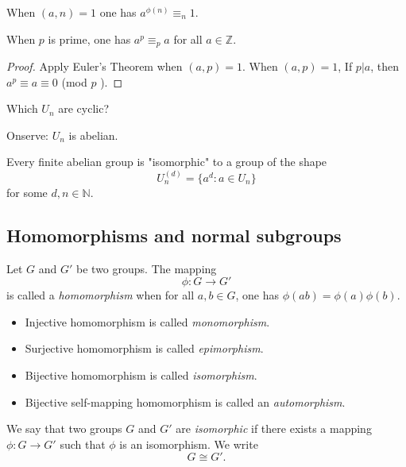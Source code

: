 \begin{corollary}
	When $(a,n) = 1$ one has $a^{\phi(n)} \equiv_n 1$.
\end{corollary}

\begin{corollary}
	When $p$ is prime, one has $a^p \equiv_p a$ for all  $a \in \mathbb{Z}$.
\end{corollary}
\begin{proof}
	Apply Euler's Theorem when $(a,p) = 1$.
	When $(a,p) = 1$, If $p|a$, then $a^p \equiv a \equiv 0$ (mod $p$ ).
\end{proof}

Which $U_n$ are cyclic?

Onserve: $U_n$ is abelian. 

\begin{fact}
	Every finite abelian group is "isomorphic" to a group of the shape \[
		U_n^{(d)} = \{a^d: a \in U_n\} 
	\] 
	for some $d, n \in \mathbb{N}$.
\end{fact}

\subsection{Homomorphisms and normal subgroups}

\begin{definition}[Homomorphism]
	Let $G$ and $G'$ be two groups. The mapping \[
		\phi: G \to  G'
	\] 
	is called a \textit{homomorphism} when for all $a,b \in G$, one has $\phi(ab) = \phi(a)\phi(b)$.

	\begin{itemize}
		\item 
	Injective homomorphism is called \textit{monomorphism}. 
\item Surjective homomorphism is called \textit{epimorphism}. 
\item Bijective homomorphism is called \textit{isomorphism}.
\item Bijective self-mapping homomorphism is called an \textit{automorphism}.
	\end{itemize}
\end{definition}

\begin{definition}
	We say that two groups $G$ and $G'$ are \textit{isomorphic} if there exists a mapping $\phi: G \to G'$ such that $\phi$ is an isomorphism. We write \[
		G \cong G'
	.\] 
\end{definition}

